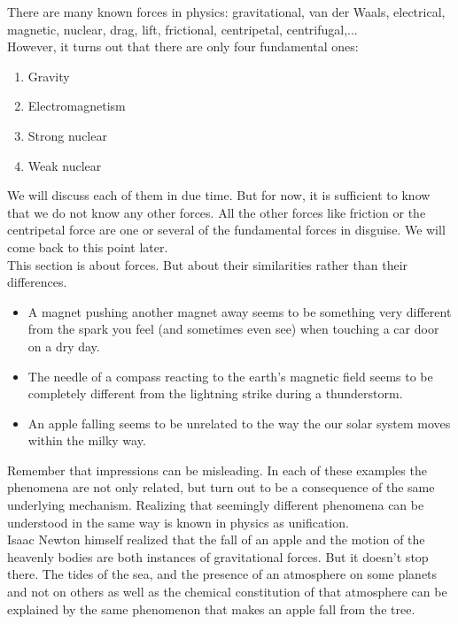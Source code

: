 \noindent There are many known forces in physics: gravitational, van der Waals,  electrical, magnetic, nuclear, drag, lift, frictional, centripetal, centrifugal,...\\

\noindent However, it turns out that there are only four fundamental ones:
\begin{enumerate}
\item Gravity
\item Electromagnetism
\item Strong nuclear
\item Weak nuclear
\end{enumerate}
We will discuss each of them in due time. But for now, it is sufficient to know that we do not know any other forces. All the other forces like friction or the centripetal force are one or several of the fundamental forces in disguise. We will come back to this point later.\\

\noindent This section is about forces. But about their similarities rather than their differences.
\begin{itemize}
\item A magnet pushing another magnet away seems to be something very different from the spark you feel (and sometimes even see) when touching a car door on a dry day.
\item The needle of a compass reacting to the earth's magnetic field seems to be completely different from the lightning strike during a thunderstorm.
\item An apple falling seems to be unrelated to the way the our solar system moves within the milky way.
\end{itemize}
Remember that impressions can be misleading. In each of these examples the phenomena are not only related, but turn out to be a consequence of the same underlying mechanism. Realizing that seemingly different phenomena can be understood in the same way is known in physics as unification.\\

\noindent Isaac Newton himself realized that the fall of an apple and the motion of the heavenly bodies are both instances of gravitational forces. But it doesn't stop there. The tides of the sea, and the presence of an atmosphere on some planets and not on others as well as the chemical constitution of that atmosphere can be explained by the same phenomenon that makes an apple fall from the tree.

